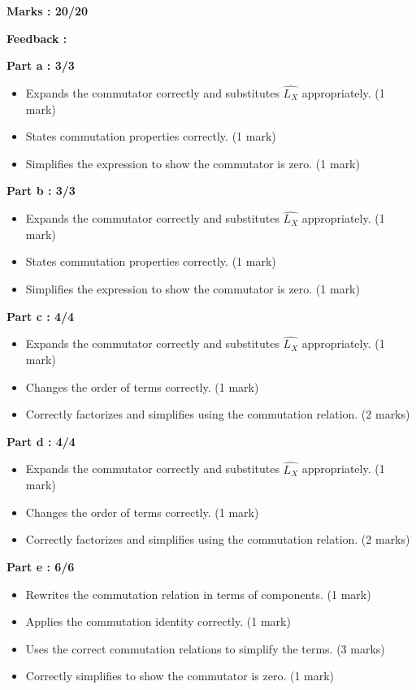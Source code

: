 \documentclass[a4paper,11pt]{article}
\begin{document}
\textbf{Marks : 20/20}

\textbf{Feedback :}

\textbf{Part a : 3/3}

\begin{itemize}
    \item Expands the commutator correctly and substitutes $\hat{L_X}$ appropriately. (1 mark)
    \item States commutation properties correctly. (1 mark)
    \item Simplifies the expression to show the commutator is zero. (1 mark)
\end{itemize}


\textbf{Part b : 3/3}

\begin{itemize}
    \item Expands the commutator correctly and substitutes $\hat{L_X}$ appropriately. (1 mark)
    \item States commutation properties correctly. (1 mark)
    \item Simplifies the expression to show the commutator is zero. (1 mark)
\end{itemize}


\textbf{Part c : 4/4}

\begin{itemize}
    \item Expands the commutator correctly and substitutes $\hat{L_X}$ appropriately. (1 mark)
    \item Changes the order of terms correctly. (1 mark)
    \item Correctly factorizes and simplifies using the commutation relation. (2 marks)
\end{itemize}


\textbf{Part d : 4/4}

\begin{itemize}
    \item Expands the commutator correctly and substitutes $\hat{L_X}$ appropriately. (1 mark)
    \item Changes the order of terms correctly. (1 mark)
    \item Correctly factorizes and simplifies using the commutation relation. (2 marks)
\end{itemize}



\textbf{Part e : 6/6}

\begin{itemize}
    \item Rewrites the commutation relation in terms of components. (1 mark)
    \item Applies the commutation identity correctly. (1 mark)
    \item Uses the correct commutation relations to simplify the terms. (3 marks)
    \item Correctly simplifies to show the commutator is zero. (1 mark)
\end{itemize}
\end{document}
